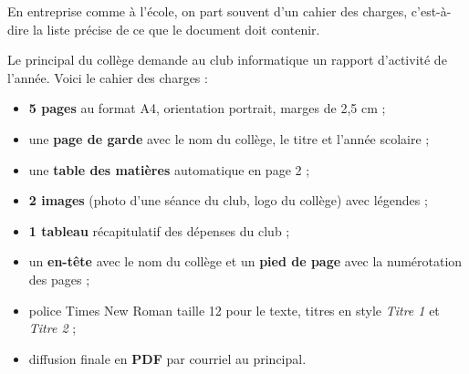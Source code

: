 \documentclass[11pt]{article}
\newcommand{\cle}[1]{{\popxbold\color{popdark}#1}}
\begin{document}
En entreprise comme à l'école, on part souvent d'un \cle{cahier des charges}, c'est-à-dire la liste précise de ce que le document doit contenir.

\begin{exemplebox}
Le principal du collège demande au club informatique un rapport d'activité de l'année. Voici le cahier des charges :
\begin{itemize}
\item \textbf{5 pages} au format A4, orientation portrait, marges de 2,5 cm ;
\item une \textbf{page de garde} avec le nom du collège, le titre et l'année scolaire ;
\item une \textbf{table des matières} automatique en page 2 ;
\item \textbf{2 images} (photo d'une séance du club, logo du collège) avec légendes ;
\item \textbf{1 tableau} récapitulatif des dépenses du club ;
\item un \textbf{en-tête} avec le nom du collège et un \textbf{pied de page} avec la numérotation des pages ;
\item police Times New Roman taille 12 pour le texte, titres en style \emph{Titre 1} et \emph{Titre 2} ;
\item diffusion finale en \textbf{PDF} par courriel au principal.
\end{itemize}
\end{exemplebox}
\end{document}
